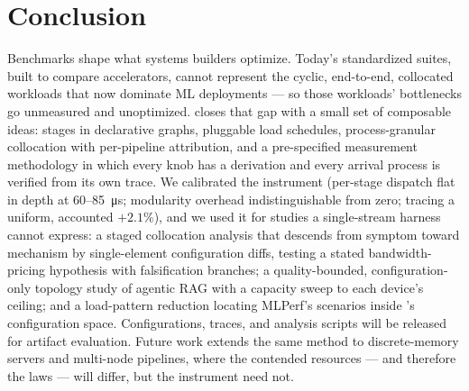 \section{Conclusion}
\label{sec:conclusion}

Benchmarks shape what systems builders optimize. Today's standardized suites,
built to compare accelerators, cannot represent the cyclic, end-to-end,
collocated workloads that now dominate ML deployments --- so those workloads'
bottlenecks go unmeasured and unoptimized. \sysname{} closes that gap with a
small set of composable ideas: stages in declarative graphs, pluggable load
schedules, process-granular collocation with per-pipeline attribution, and a
pre-specified measurement methodology in which every knob has a derivation
and every arrival process is verified from its own trace. We calibrated the instrument (per-stage dispatch flat in depth at
\SI{60}{}--\SI{85}{\micro\second}; modularity overhead indistinguishable
from zero; tracing a uniform, accounted $+2.1\%$), and we used it for studies a single-stream harness cannot express: a
staged collocation analysis that descends from symptom toward mechanism by
single-element configuration diffs, testing a stated bandwidth-pricing
hypothesis with falsification branches; a quality-bounded,
configuration-only topology study of agentic RAG with a capacity sweep to
each device's ceiling; and a load-pattern reduction locating MLPerf's
scenarios inside \sysname{}'s configuration space. Configurations, traces, and analysis
scripts will be released for artifact evaluation. Future work extends the same
method to discrete-memory servers and multi-node pipelines, where the
contended resources --- and therefore the laws --- will differ, but the
instrument need not.
